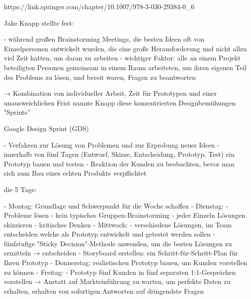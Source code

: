 https://link.springer.com/chapter/10.1007/978-3-030-29384-0_6

Jake Knapp stellte fest:

- während großen Brainstorming Meetings, die besten Ideen oft von Einzelpersonen entwickelt wurden, die eine große Herausforderung und nicht allzu viel Zeit hatten, um daran zu arbeiten
- wichtiger Faktor: alle an einem Projekt beteiligten Personen gemeinsam in einem Raum arbeiteten, um ihren eigenen Teil des Problems zu lösen, und bereit waren, Fragen zu beantworten

→ Kombination von individueller Arbeit, Zeit für Prototypen und einer unausweichlichen Frist nannte Knapp diese konzentrierten Designbemühungen "Sprints”

Google Design Sprint (GDS)

- Verfahren zur Lösung von Problemen und zur Erprobung neuer Ideen
- innerhalb von fünf Tagen (Entwurf, Skizze, Entscheidung, Prototyp, Test) ein Prototyp bauen und testen
- Reaktion der Kunden zu beobachten, bevor man sich zum Bau eines echten Produkts verpflichtet

\cite[vgl.][]{GDS}

die 5 Tage:

- Montag: Grundlage und Schwerpunkt für die Woche schaffen
- Dienstag:
    - Probleme lösen
    - kein typisches Gruppen-Brainstorming
    - jeder Einzeln Lösungen skizzieren - kritisches Denken
- Mittwoch:
    - verschiedene Lösungen, im Team entscheiden welche als Prototyp entwickelt und getestet werden sollen
    - fünfstufige "Sticky Decision"-Methode anwenden, um die besten Lösungen zu ermitteln → entscheiden
    - Storyboard erstellen: ein Schritt-für-Schritt-Plan für Ihren Prototyp
- Donnerstag: realistischen Prototyp bauen, um Kunden vorstellen zu können
- Freitag:
    - Prototyp fünf Kunden in fünf separaten 1:1-Gesprächen vorstellen
    → Anstatt auf Markteinführung zu warten, um perfekte Daten zu erhalten, erhalten von sofortigen Antworten auf dringendste Fragen